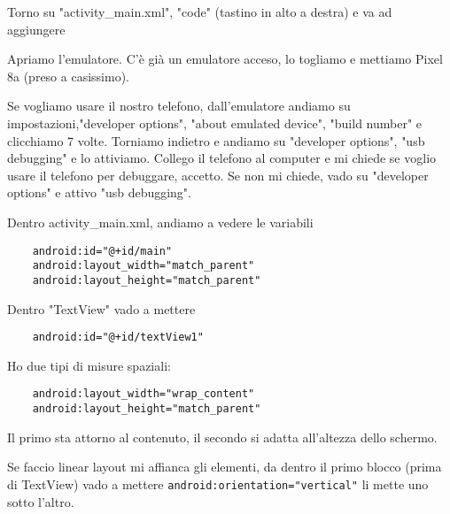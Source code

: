 \par Torno su "activity\_main.xml", "code" (tastino in alto a destra) e va ad aggiungere 

\par Apriamo l'emulatore. C'è già un emulatore acceso, lo togliamo e mettiamo Pixel 8a (preso a casissimo).
\par Se vogliamo usare il nostro telefono, dall'emulatore andiamo su impostazioni,"developer options", "about emulated device", "build number" e clicchiamo 7 volte. Torniamo indietro e andiamo su "developer options", "usb debugging" e lo attiviamo. Collego il telefono al computer e mi chiede se voglio usare il telefono per debuggare, accetto. Se non mi chiede, vado su "developer options" e attivo "usb debugging".

\par Dentro activity\_main.xml, andiamo a vedere le variabili
\begin{verbatim}
    android:id="@+id/main"
    android:layout_width="match_parent"
    android:layout_height="match_parent"
\end{verbatim}
\par Dentro "TextView" vado a mettere
\begin{verbatim}
    android:id="@+id/textView1"
\end{verbatim}
\par Ho due tipi di misure spaziali:
\begin{verbatim}
    android:layout_width="wrap_content"
    android:layout_height="match_parent"
\end{verbatim}
\par Il primo sta attorno al contenuto, il secondo si adatta all'altezza dello schermo.
\par Se faccio linear layout mi affianca gli elementi, da dentro il primo blocco (prima di TextView) vado a mettere \texttt{android:orientation="vertical"} li mette uno sotto l'altro.